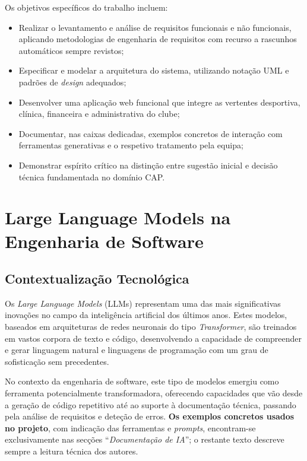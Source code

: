 \documentclass[a4paper,12pt]{scrreprt}
\begin{document}
Os objetivos específicos do trabalho incluem:
\begin{itemize}
    \item Realizar o levantamento e análise de requisitos funcionais e não funcionais, aplicando metodologias de engenharia de requisitos com recurso a rascunhos automáticos sempre revistos;
    \item Especificar e modelar a arquitetura do sistema, utilizando notação UML e padrões de \textit{design} adequados;
    \item Desenvolver uma aplicação web funcional que integre as vertentes desportiva, clínica, financeira e administrativa do clube;
    \item Documentar, nas caixas dedicadas, exemplos concretos de interação com ferramentas generativas e o respetivo tratamento pela equipa;
    \item Demonstrar espírito crítico na distinção entre sugestão inicial e decisão técnica fundamentada no domínio CAP.
\end{itemize}

\section{Large Language Models na Engenharia de Software}

\subsection{Contextualização Tecnológica}

Os \textit{Large Language Models} (LLMs) representam uma das mais significativas inovações no campo da inteligência artificial dos últimos anos. Estes modelos, baseados em arquiteturas de redes neuronais do tipo \textit{Transformer}, são treinados em vastos corpora de texto e código, desenvolvendo a capacidade de compreender e gerar linguagem natural e linguagens de programação com um grau de sofisticação sem precedentes.

No contexto da engenharia de software, este tipo de modelos emergiu como ferramenta potencialmente transformadora, oferecendo capacidades que vão desde a geração de código repetitivo até ao suporte à documentação técnica, passando pela análise de requisitos e deteção de erros. \textbf{Os exemplos concretos usados no projeto}, com indicação das ferramentas e \textit{prompts}, encontram-se exclusivamente nas secções ``\textit{Documentação de IA}''; o restante texto descreve sempre a leitura técnica dos autores.
\end{document}

